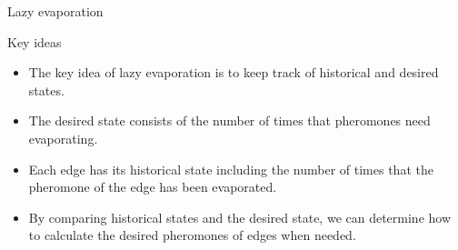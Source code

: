 \documentclass[aspectratio=169]{beamer}
\begin{document}
\begin{frame}{Lazy evaporation}
    \begin{block}{Key ideas}
        \begin{itemize}
            \justifying
            \vspace{0.1cm}
            \item The key idea of lazy evaporation is to keep track of historical and desired states.
                  \vspace{0.1cm}
            \item The desired state consists of the number of times that pheromones need evaporating.
                  \vspace{0.1cm}
            \item Each edge has its historical state including the number of times that the pheromone of the edge has been evaporated.
                  \vspace{0.1cm}
            \item By comparing historical states and the desired state, we can determine how to calculate the desired pheromones of edges when needed.
                  \vspace{0.1cm}
        \end{itemize}
    \end{block}
\end{frame}






\end{document}
